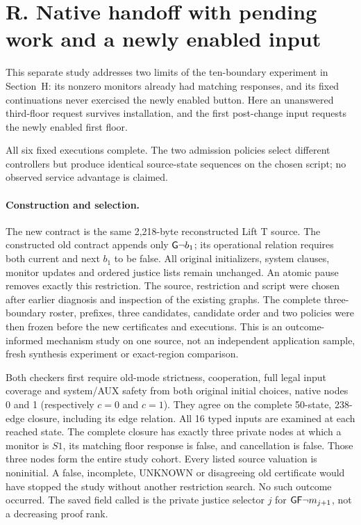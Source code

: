 \section*{R. Native handoff with pending work and a newly enabled input}
\label{supp:pending-native-handoff}
This separate study addresses two limits of the ten-boundary experiment
in Section~H: its nonzero monitors already had matching responses, and
its fixed continuations never exercised the newly enabled button.
Here an unanswered third-floor request survives installation, and the
first post-change input requests the newly enabled first floor.

All six fixed executions complete. The two admission policies select
different controllers but produce identical source-state sequences on
the chosen script; no observed service advantage is claimed.

\paragraph{Construction and selection.}
The new contract is the same 2,218-byte reconstructed Lift T source.
The constructed old contract appends only $\mathsf{G}\neg b_1$; its operational
relation requires both current and next $b_1$ to be false. All original
initializers, system clauses, monitor updates and ordered justice lists
remain unchanged. An atomic pause removes exactly this restriction.
The source, restriction and script were chosen after earlier diagnosis
and inspection of the existing graphs. The complete three-boundary
roster, prefixes, three candidates, candidate order and two policies were
then frozen before the new certificates and executions. This is an
outcome-informed mechanism study on one source, not an independent
application sample, fresh synthesis experiment or exact-region comparison.

Both checkers first require old-mode strictness, cooperation, full legal
input coverage and system/AUX safety from both original initial choices,
native nodes 0 and 1 (respectively $c=0$ and $c=1$).
They agree on the complete 50-state, 238-edge closure, including its edge
relation. All 16 typed inputs are examined at each reached state.
The complete closure has exactly three private nodes at which a monitor
is $S1$, its matching floor response is false, and cancellation is false.
Those three nodes form the entire study cohort. Every listed source
valuation is noninitial. A false, incomplete, UNKNOWN or disagreeing old
certificate would have stopped the study without another restriction
search. No such outcome occurred.
The saved field called  is the private justice selector $j$
for $\mathsf{G}\mathsf{F}\neg m_{j+1}$, not a decreasing proof rank.

